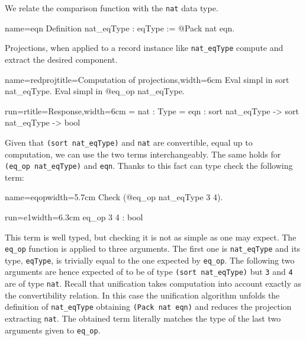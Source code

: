 We relate the  comparison function with the \lstinline/nat/
data type.

\begin{coq}{name=eqn}{}
Definition nat_eqType : eqType := @Pack nat eqn.
\end{coq}

Projections, when applied to a record instance like
\lstinline/nat_eqType/ compute and extract the desired component.

\begin{coq-left}{name=redproj}{title=Computation of projections,width=6cm}
Eval simpl in sort nat_eqType.
Eval simpl in @eq_op nat_eqType.
\end{coq-left}
\begin{coqout-right}{run=r}{title=Response,width=6cm}
= nat : Type
= eqn : sort nat_eqType ->
         sort nat_eqType -> bool
\end{coqout-right}

Given that \lstinline/(sort nat_eqType)/ and \lstinline/nat/
are convertible, equal up to computation, we can use the two terms
interchangeably.  The same holds for \lstinline/(eq_op nat_eqType)/
and \lstinline/eqn/.  Thanks to this fact \Coq{} can type check the
following term:

\begin{coq-left}{name=eqop}{width=5.7cm}
Check (@eq_op nat_eqType 3 4).
\end{coq-left}
\begin{coqout-right}{run=e1}{width=6.3cm}
eq_op 3 4 : bool
\end{coqout-right}

This term is well typed, but checking it is not as simple as one may
expect.
The \lstinline/eq_op/ function is applied to three arguments.
The first one is \lstinline/nat_eqType/ and its type,
\lstinline/eqType/, is trivially equal to the one expected by
\lstinline/eq_op/.
The following two arguments are hence expected of to be of type
\lstinline/(sort nat_eqType)/ but \lstinline/3/ and \lstinline/4/ are
of type \lstinline/nat/.
Recall that unification takes computation into account exactly as the
convertibility relation.  In this case the unification algorithm
unfolds the definition of \lstinline/nat_eqType/ obtaining
\lstinline/(Pack nat eqn)/ and reduces the projection
extracting  \lstinline/nat/.  The obtained term literally matches the
type of the last two arguments given to \lstinline/eq_op/.

